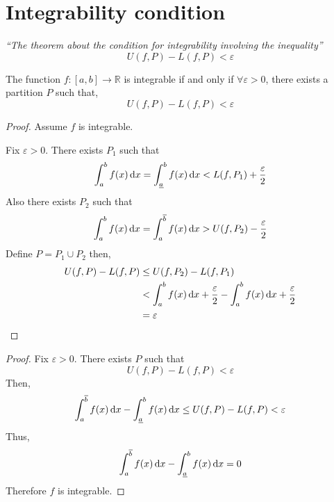 \documentclass[12pt]{report}
\begin{document}
    \section{Integrability condition}
    \textit{``The theorem about the condition for integrability involving the inequality''} 
    \[U(f,P) - L(f,P) < \varepsilon\]
    \begin{theorem}
        The function \(f: [a,b] \to \mathbb{R}\) is integrable if and only if \(\forall \varepsilon > 0\), there exists a partition \(P\) such that,
        \[U(f,P) - L(f,P) < \varepsilon\]
    \end{theorem}
    \begin{proof}
        Assume \(f\) is integrable.

        Fix \(\varepsilon > 0\). There exists \(P_1\) such that 
        \[\int^b_a f(x) \, \mathrm{d} x  = \int ^b _{\underline{a}} f(x) \, \mathrm{d} x < L(f,P_1) + \frac{\varepsilon}{2}\]
        Also there exists \(P_2\) such that
        \[\int^b_a f(x) \, \mathrm{d} x  = \int ^{\overline{b}}_a f(x) \, \mathrm{d} x > U(f,P_2) - \frac{\varepsilon}{2}\]
        Define \(P = P_1 \cup P_2\) then,
        \begin{align*}
            U(f,P) - L(f,P) &\leq U(f,P_2) - L(f,P_1)\\
            &< \int^b_a f(x) \, \mathrm{d} x + \frac{\varepsilon}{2} - \int^b_a f(x) \, \mathrm{d} x + \frac{\varepsilon}{2}\\
            &= \varepsilon
        \end{align*}
    \end{proof}
    \begin{proof}
        Fix \(\varepsilon > 0\). There exists \(P\) such that
        \[U(f,P) - L(f,P) < \varepsilon\]
        Then,
        \[\int ^{\overline{b}}_a f(x) \, \mathrm{d} x - \int ^b _{\underline{a}} f(x) \, \mathrm{d} x \leq U(f,P) - L(f,P) < \varepsilon\]
        Thus,
        \[\int ^{\overline{b}}_a f(x) \, \mathrm{d} x - \int ^b _{\underline{a}} f(x) \, \mathrm{d} x = 0\]
        Therefore \(f\) is integrable.
    \end{proof}
\end{document}
